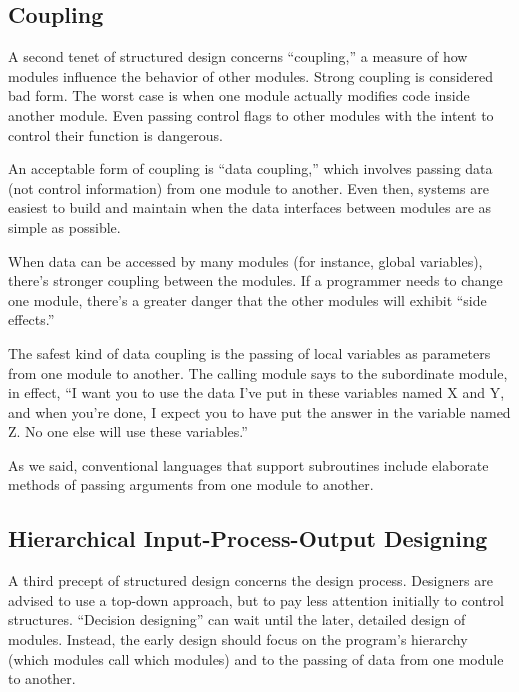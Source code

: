 \subsection{Coupling}%
%
A second tenet of structured design concerns ``coupling,'' a measure
of how modules influence the behavior of other modules.  Strong
coupling is considered bad form. The worst case is when one module
actually modifies code inside another module. Even passing control
flags to other modules with the intent to control their function is
dangerous.

An acceptable form of coupling is ``data coupling,''%
which involves passing data (not control information) from one module
to another.  Even then, systems are easiest to build and maintain when
the data interfaces between modules are as simple as possible.

When data can be accessed by many modules (for instance, global
variables), there's stronger coupling between the modules. If a
programmer needs to change one module, there's a greater danger that
the other modules will exhibit ``side effects.''

The safest kind of data coupling is the passing of local variables as
parameters from one module to another. The calling module says to the
subordinate module, in effect, ``I want you to use the data I've put
in these variables named X and Y, and when you're done, I expect you
to have put the answer in the variable named Z. No one else will use
these variables.''

As we said, conventional languages that support subroutines include
elaborate methods of passing arguments from one module to another.%
%


\subsection{Hierarchical Input-Process-Output Designing}%
%
%
A third precept of structured design concerns the design process.
Designers are advised to use a top-down approach, but to pay less
attention initially to control structures. ``Decision designing'' can
wait until the later, detailed design of modules. Instead, the early
design should focus on the program's hierarchy (which modules call
which modules) and to the passing of data from one module to another.

